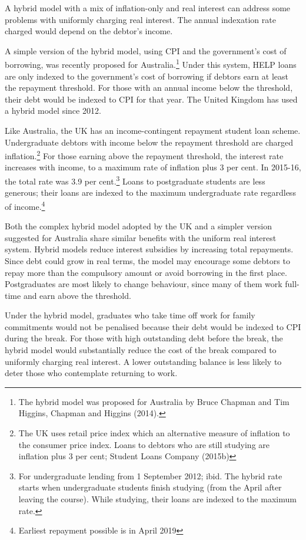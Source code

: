\documentclass[embargoed]{grattan}
\begin{document}
A hybrid model with a mix of inflation-only and real interest can address some problems with uniformly charging real interest. The annual indexation rate charged would depend on the debtor's income.

A simple version of the hybrid model, using CPI and the government's cost of borrowing, was recently proposed for Australia.\footnote{The hybrid model was proposed for Australia by Bruce Chapman and Tim Higgins, Chapman and Higgins (2014).} Under this system, HELP loans are only indexed to the government's cost of borrowing if debtors earn at least the repayment threshold. For those with an annual income below the threshold, their debt would be indexed to CPI for that year. The United Kingdom has used a hybrid model since 2012.

Like Australia, the UK has an income-contingent repayment student loan scheme. Undergraduate debtors with income below the repayment threshold are charged inflation.\footnote{The UK uses retail price index which an alternative measure of inflation to the consumer price index. Loans to debtors who are still studying are inflation plus 3 per cent; Student Loans Company (2015b)} For those earning above the repayment threshold, the interest rate increases with income, to a maximum rate of inflation plus 3 per cent. In 2015-16, the total rate was 3.9 per cent.\footnote{For undergraduate lending from 1 September 2012; ibid. The hybrid rate starts when undergraduate students finish studying (from the April after leaving the course). While studying, their loans are indexed to the maximum rate.} Loans to postgraduate students are less generous; their loans are indexed to the maximum undergraduate rate regardless of income.\footnote{Earliest repayment possible is in April 2019}

Both the complex hybrid model adopted by the UK and a simpler version suggested for Australia share similar benefits with the uniform real interest system. Hybrid models reduce interest subsidies by increasing total repayments. Since debt could grow in real terms, the model may encourage some debtors to repay more than the compulsory amount or avoid borrowing in the first place. Postgraduates are most likely to change behaviour, since many of them work full-time and earn above the threshold.

Under the hybrid model, graduates who take time off work for family commitments would not be penalised because their debt would be indexed to CPI during the break. For those with high outstanding debt before the break, the hybrid model would substantially reduce the cost of the break compared to uniformly charging real interest. A lower outstanding balance is less likely to deter those who contemplate returning to work.
\end{document}
